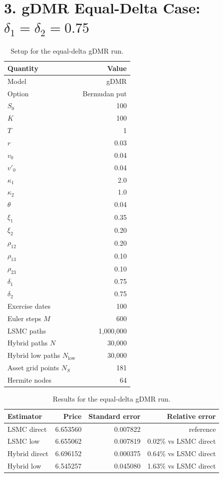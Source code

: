\documentclass[11pt]{article}
\begin{document}
\section*{3. gDMR Equal-Delta Case: $\delta_1=\delta_2=0.75$}

\begin{table}[ht]
\centering
\caption{Setup for the equal-delta gDMR run.}
\begin{tabular}{lr}
\toprule
Quantity & Value \\
\midrule
Model & gDMR \\
Option & Bermudan put \\
$S_0$ & 100 \\
$K$ & 100 \\
$T$ & 1 \\
$r$ & 0.03 \\
$v_0$ & 0.04 \\
$v'_0$ & 0.04 \\
$\kappa_1$ & 2.0 \\
$\kappa_2$ & 1.0 \\
$\theta$ & 0.04 \\
$\xi_1$ & 0.35 \\
$\xi_2$ & 0.20 \\
$\rho_{12}$ & 0.20 \\
$\rho_{13}$ & 0.10 \\
$\rho_{23}$ & 0.10 \\
$\delta_1$ & 0.75 \\
$\delta_2$ & 0.75 \\
Exercise dates & 100 \\
Euler steps $M$ & 600 \\
LSMC paths & 1,000,000 \\
Hybrid paths $N$ & 30,000 \\
Hybrid low paths $N_{\mathrm{low}}$ & 30,000 \\
Asset grid points $N_S$ & 181 \\
Hermite nodes & 64 \\
\bottomrule
\end{tabular}
\end{table}

\begin{table}[ht]
\centering
\caption{Results for the equal-delta gDMR run.}
\begin{tabular}{lrrr}
\toprule
Estimator & Price & Standard error & Relative error \\
\midrule
LSMC direct   & 6.653560 & 0.007822 & reference \\
LSMC low      & 6.655062 & 0.007819 & 0.02\% vs LSMC direct \\
Hybrid direct & 6.696152 & 0.000375 & 0.64\% vs LSMC direct \\
Hybrid low    & 6.545257 & 0.045080 & 1.63\% vs LSMC direct \\
\bottomrule
\end{tabular}
\end{table}
\end{document}
